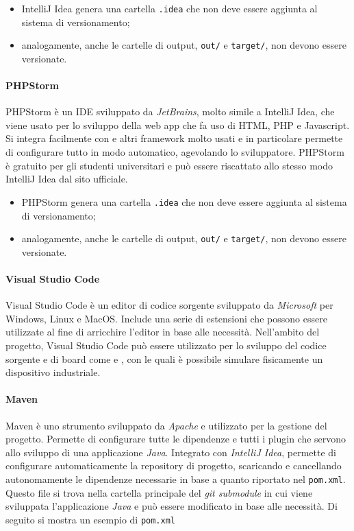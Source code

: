 					\begin{itemize}
						\item IntelliJ Idea genera una cartella \verb!.idea! che non deve essere aggiunta al sistema di versionamento;
						\item analogamente, anche le cartelle di output, \verb!out/! e \verb!target/!, non devono essere versionate.
					\end{itemize}

				\paragraph{PHPStorm}
					PHPStorm è un IDE sviluppato da \textit{JetBrains}, molto simile a IntelliJ Idea, che viene usato per lo sviluppo della web app che fa uso di HTML, PHP e Javascript. Si integra facilmente con  e altri framework molto usati e in particolare permette di configurare tutto in modo automatico, agevolando lo sviluppatore. PHPStorm è gratuito per gli studenti universitari e può essere riscattato allo stesso modo IntelliJ Idea dal sito ufficiale. 

					\begin{itemize}
						\item PHPStorm genera una cartella \verb!.idea! che non deve essere aggiunta al sistema di versionamento;
						\item analogamente, anche le cartelle di output, \verb!out/! e \verb!target/!, non devono essere versionate.
					\end{itemize}

				\paragraph{Visual Studio Code} 
					Visual Studio Code è un editor di codice sorgente sviluppato da \textit{Microsoft} per Windows, Linux e MacOS. Include una serie di estensioni che possono essere utilizzate al fine di arricchire l'editor in base alle necessità. Nell'ambito del progetto, Visual Studio Code può essere utilizzato per lo sviluppo del codice sorgente e di board come  e , con le quali è possibile simulare fisicamente un dispositivo industriale.
				
				\paragraph{Maven}
					Maven è uno strumento sviluppato da \textit{Apache} e utilizzato per la gestione del progetto. Permette di configurare tutte le dipendenze e tutti i plugin che servono allo sviluppo di una applicazione \textit{Java}. Integrato con \textit{IntelliJ Idea}, permette di configurare automaticamente la repository di progetto, scaricando e cancellando autonomamente le dipendenze necessarie in base a quanto riportato nel \verb!pom.xml!. Questo file si trova nella cartella principale del \textit{git submodule} in cui viene sviluppata l'applicazione \textit{Java} e può essere modificato in base alle necessità. Di seguito si mostra un esempio di \verb!pom.xml!

